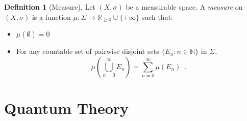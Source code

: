 \documentclass{book}
\theoremstyle{definition}
\newtheorem{df}[prop]{Definition}
\begin{document}
\begin{df}[Measure]
Let $(X, \sigma)$ be a measurable space. A \emph{measure} on $(X, \sigma)$ is a function $\mu : \Sigma \rightarrow \mathbb{R}_{\geq 0} \cup \{ + \infty \}$ such that:
\begin{itemize}
\item $\mu(\emptyset) = 0$
\item For any countable set of pairwise disjoint sets $\{ E_n : n \in \mathbb{N} \}$ in $\Sigma$,
\[ \mu \left( \bigcup_{n=0}^\infty E_n \right) = \sum_{n=0}^\infty \mu(E_n) \enspace . \]
\end{itemize}
\end{df}

\part{Quantum Theory}
\end{document}
